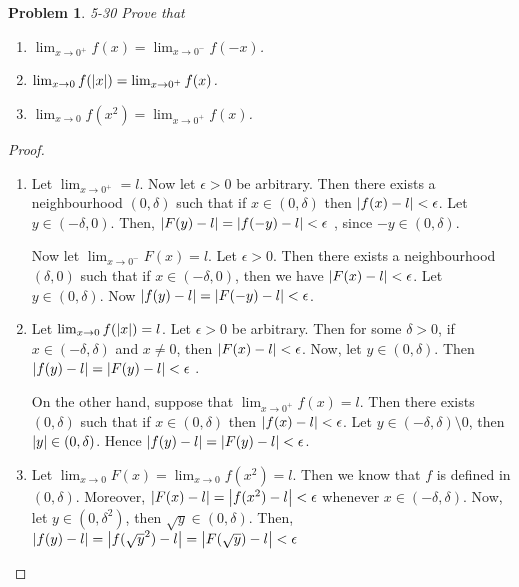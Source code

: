 \documentclass[12pt]{book}
\newcommand\T{\rule{0pt}{2.6ex}}
\newcommand\B{\rule[-1.2ex]{0pt}{0pt}}
\newtheorem*{problem*}{Problem}
\begin{document}
\begin{problem*}
 5-30  Prove that
  \begin{enumerate}
  \item $\lim_{x \to 0^+} f(x) = \lim_{ x \to 0^-} f(-x)$.
  \item $\lim_{x \to 0} f(\abs{x}) = \lim_{ x \to 0^+} f(x)$.
  \item $\lim_{x \to 0} f(x^2) = \lim_{ x \to 0^+} f(x)$.
  \end{enumerate}
% 
\end{problem*}

\begin{proof}
  \begin{enumerate}
  \item  Let $\lim_{x \to 0^+} = l $. Now let $\epsilon > 0$ be arbitrary. Then there exists a neighbourhood $(0, \delta)$ such that if $x \in (0, \delta)$ then $\abs{f(x) -l} < \epsilon$. Let $y \in (-\delta , 0)$. Then, $\abs{F(y) - l} = \abs{f(-y) -l } < \epsilon$ , since $-y \in (0, \delta)$.

    \T\B Now let $\lim_{x \to 0^-} F(x) = l$. Let $\epsilon > 0$. Then there
    exists a neighbourhood $(\delta , 0)$ such that if $x \in (-\delta, 0)$,
    then we have $\abs{F(x) -l } < \epsilon$. Let $y \in (0, \delta)$. Now $\abs{f(y) -l } = \abs{F(-y) -l} < \epsilon$.

  \item Let $\lim_{x \to 0} f(\abs{x}) = l$. Let $\epsilon > 0$ be arbitrary. Then for some $\delta > 0$, if $ x \in (-\delta, \delta)$  and $x \ne 0$, then $\abs{F(x) -l } < \epsilon$. Now, let $y \in (0, \delta)$. Then $\abs{f(y) -l } = \abs{F(y) -l} < \epsilon$ .

    \T\B On the other hand, suppose that $\lim_{x \to 0^+}f(x) = l$. Then there exists $(0, \delta)$ such that if $x \in (0, \delta)$ then $\abs{f(x) -l} < \epsilon$. Let $ y \in (-\delta, \delta) \setminus {0}$, then $\abs{y} \in (0, \delta)$. Hence $\abs{f(y) -l} = \abs{F(y) -l} < \epsilon$.

    \item Let $\lim_{x \to 0}F(x) = \lim_{x \to 0}f(x^2) = l$. Then we know that $f$ is defined in $(0, \delta)$. Moreover, $\abs{F(x) -l } = \abs{f(x^2) -l } < \epsilon$ whenever $x \in (-\delta , \delta)$. Now, let $y \in (0, \delta^2)$, then $\sqrt{y} \in (0, \delta)$. Then, $\abs{f(y) -l } = \abs{f(\sqrt{y}^2) -l} = \abs{F(\sqrt{y}) - l} < \epsilon$ 
  \end{enumerate}

\end{proof}
\end{document}
